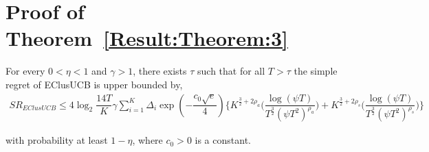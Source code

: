 

\section{Proof of Theorem~\ref{Result:Theorem:3}}
\label{App:SR_EClusUCB}
\begin{theorem}
\label{Result:Theorem:3}

For every $0<\eta <1$ and $\gamma > 1$, there exists $\tau$ such that for all $T>\tau$ the simple regret of EClusUCB is upper bounded by,
\begin{align*}
SR_{EClusUCB} \leq 4\log_{2}\dfrac{14 T}{K}\gamma \sum_{i=1}^{K} \Delta_{i} \exp(-\dfrac{c_{0}\sqrt{e}}{4}) \bigg\lbrace K^{\frac{3}{2} +2\rho_{a}} \bigg(\dfrac{\log (\psi T )}{T^{\frac{3}{2}}(\psi T^2)^{\rho_{a}}}\bigg) + K^{\frac{3}{2} +2\rho_{s}} \bigg(\dfrac{\log (\psi T )}{T^{\frac{3}{2}}(\psi T^2)^{\rho_{s}}}\bigg) \bigg\rbrace
\end{align*}

with probability at least $1-\eta$, where $c_{0}>0$ is a constant.

\end{theorem}


